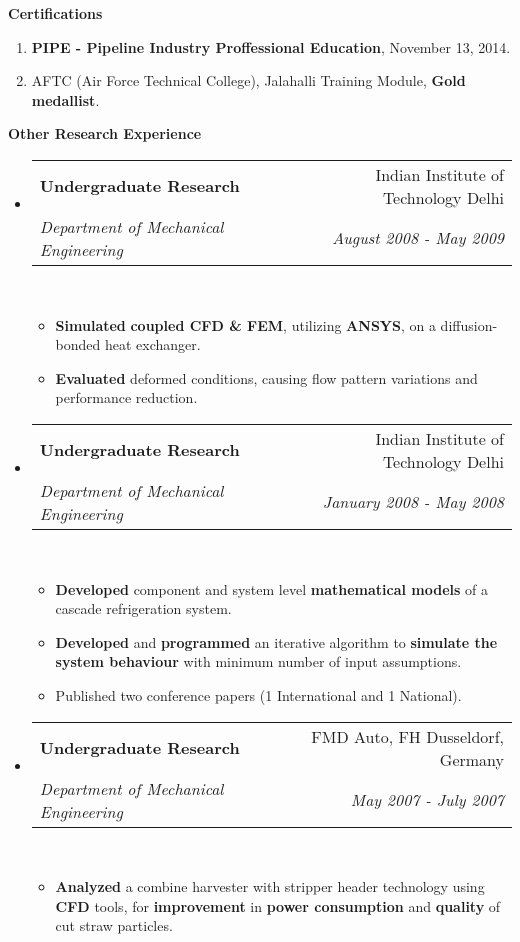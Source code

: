 \documentclass[letterpaper,11pt]{article}
\makeatletter
\newcommand{\resitem}[1]{\item #1 \vspace{-2pt}}
\newcommand{\resheading}[1]{{\large \colorbox{mygrey}{\begin{minipage}{\textwidth}{\textbf{#1 \vphantom{p\^{E}}}}\end{minipage}}}}
\newcommand{\ressubheading}[4]{
\begin{tabular*}{7.0in}{l@{\extracolsep{\fill}}r}
		\textbf{#1} & #2 \\
		\textit{#3} & \textit{#4} \\
\end{tabular*}\vspace{-6pt}}
\makeatother
\begin{document}
\resheading{Certifications}
\begin{enumerate}
	\resitem{{\small \textbf{PIPE - Pipeline Industry Proffessional Education}, November 13, 2014.}}
	\resitem{{\small AFTC (Air Force Technical College), Jalahalli Training Module, \textbf{Gold medallist}.}}
\end{enumerate}

\resheading{Other Research Experience}
\begin{itemize}
	\item
	      \ressubheading{Undergraduate Research}{Indian Institute of Technology Delhi}{Department of Mechanical Engineering}{August 2008 - May 2009}\\
	      \begin{itemize}
		      \resitem{{\small \textbf{Simulated} \textbf{coupled CFD \& FEM}, utilizing \textbf{ANSYS}, on a diffusion-bonded heat exchanger.}}
		      \resitem{{\small \textbf{Evaluated} deformed conditions, causing flow pattern variations and performance reduction.}}
	      \end{itemize}
	\item
	      \ressubheading{Undergraduate Research}{Indian Institute of Technology Delhi}{Department of Mechanical Engineering}{January 2008 - May 2008}\\
	      \begin{itemize}
		      \resitem{{\small \textbf{Developed} component and system level \textbf{mathematical models} of a cascade refrigeration system.}}
		      \resitem{{\small \textbf{Developed} and \textbf{programmed} an iterative algorithm to \textbf{simulate the system behaviour} with minimum number of input assumptions.}}
		      \resitem{{\small Published two conference papers (1 International and 1 National).}}
	      \end{itemize}
	\item
	      \ressubheading{Undergraduate Research}{FMD Auto, FH Dusseldorf, Germany}{Department of Mechanical Engineering}{May 2007 - July 2007}\\
	      \begin{itemize}
		      \resitem{{\small \textbf{Analyzed} a combine harvester with stripper header technology using \textbf{CFD} tools, for \textbf{improvement} in \textbf{power consumption} and \textbf{quality} of cut straw particles.}}
	      \end{itemize}
\end{itemize}
\end{document}
